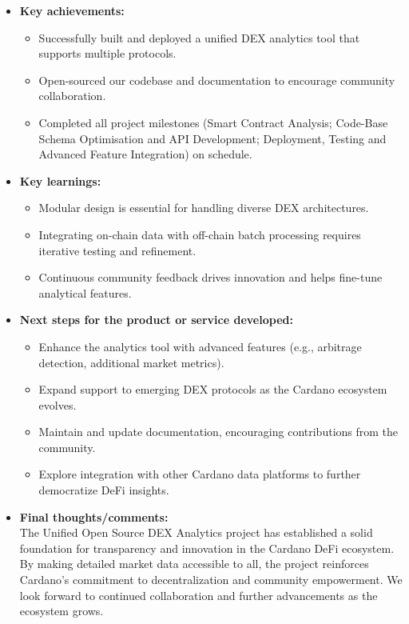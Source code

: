 \documentclass[11pt]{article}
\begin{document}
\begin{itemize}[leftmargin=1cm]
    \item \textbf{Key achievements:}
    \begin{itemize}
        \item Successfully built and deployed a unified DEX analytics tool that supports multiple protocols.
        \item Open-sourced our codebase and documentation to encourage community collaboration.
        \item Completed all project milestones (Smart Contract Analysis; Code-Base Schema Optimisation and API Development; Deployment, Testing and Advanced Feature Integration) on schedule.
    \end{itemize}
    
    \item \textbf{Key learnings:}
    \begin{itemize}
        \item Modular design is essential for handling diverse DEX architectures.
        \item Integrating on-chain data with off-chain batch processing requires iterative testing and refinement.
        \item Continuous community feedback drives innovation and helps fine-tune analytical features.
    \end{itemize}
    
    \item \textbf{Next steps for the product or service developed:}
    \begin{itemize}
        \item Enhance the analytics tool with advanced features (e.g., arbitrage detection, additional market metrics).
        \item Expand support to emerging DEX protocols as the Cardano ecosystem evolves.
        \item Maintain and update documentation, encouraging contributions from the community.
        \item Explore integration with other Cardano data platforms to further democratize DeFi insights.
    \end{itemize}
    
    \item \textbf{Final thoughts/comments:}\\
    The Unified Open Source DEX Analytics project has established a solid foundation for transparency and innovation in the Cardano DeFi ecosystem. By making detailed market data accessible to all, the project reinforces Cardano’s commitment to decentralization and community empowerment. We look forward to continued collaboration and further advancements as the ecosystem grows.
    

\end{itemize}
\end{document}

